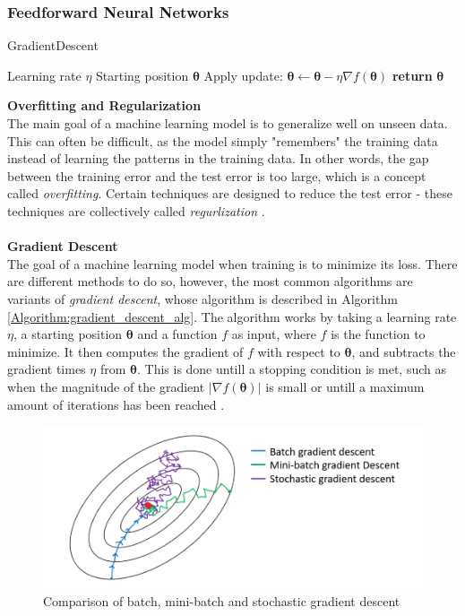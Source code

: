 \documentclass[./main.tex]{subfiles}
\begin{document}
\subsubsection{Feedforward Neural Networks} \label{subsubsec:FeedforwardNN}
\begin{algorithm}[h]
    \caption{GradientDescent \cite{d2l}}
    \label{Algorithm:gradient_descent_alg}
    \begin{algorithmic}[1]
        \Require Learning rate $\eta$
        \Require Starting position $\bm{\theta}$
            \State Apply update: $\bm{\theta} \gets  \bm{\theta} - \eta \nabla f(\bm{\theta})$
        \EndWhile
        \State \textbf{return} $\bm{\theta}$
    \end{algorithmic}
\end{algorithm}
\noindent \textbf{Overfitting and Regularization} \\
The main goal of a machine learning model is to generalize well on unseen data. This can often be difficult, as the model simply "remembers" the training data instead of learning the patterns in the training data. In other words, the gap between the training error and the test error is too large, which is a concept called \textit{overfitting}. Certain techniques are designed to reduce the test error - these techniques are collectively called \textit{regurlization} \cite{DeepLearning}. 
\\
\\
\textbf{Gradient Descent} \\
The goal of a machine learning model when training is to minimize its loss. There are different methods to do so, however, the most common algorithms are variants of \textit{gradient descent}, whose algorithm is described in Algorithm \ref{Algorithm:gradient_descent_alg}. The algorithm works by taking a learning rate $\eta$, a starting position $\bm{\theta}$ and a function $f$ as input, where $f$ is the function to minimize. It then computes the gradient of $f$ with respect to $\bm{\theta}$, and subtracts the gradient times $\eta$ from $\bm{\theta}$. This is done untill a stopping condition is met, such as when the magnitude of the gradient $\left| \nabla f(\bm{\theta}) \right|$ is small or untill a maximum amount of iterations has been reached \cite{d2l}.
\begin{figure}
    \centering
    \includegraphics[width = 8 cm]{entities/batch_methods.PNG}
    \caption{Comparison of batch, mini-batch and stochastic gradient descent \cite{EML_optimization}}
    \label{fig:batch_methods}
\end{figure}
\end{document}
